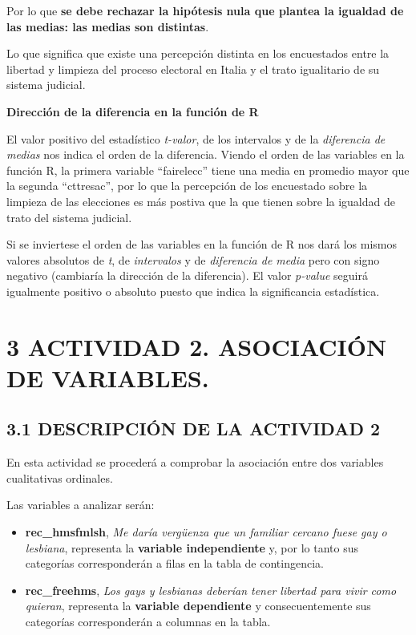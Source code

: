 \documentclass[
  12 pt,
  a4paper,
]{article}
\begin{document}
Por lo que \textbf{se debe rechazar la hipótesis nula que plantea la
igualdad de las medias: las medias son distintas}.

Lo que significa que existe una percepción distinta en los encuestados
entre la libertad y limpieza del proceso electoral en Italia y el trato
igualitario de su sistema judicial.

\textbf{Dirección de la diferencia en la función de R}

El valor positivo del estadístico \emph{t-valor}, de los intervalos y de
la \emph{diferencia de medias} nos indica el orden de la diferencia.
Viendo el orden de las variables en la función R, la primera variable
``fairelecc'' tiene una media en promedio mayor que la segunda
``cttresac'', por lo que la percepción de los encuestado sobre la
limpieza de las elecciones es más postiva que la que tienen sobre la
igualdad de trato del sistema judicial.

Si se inviertese el orden de las variables en la función de R nos dará
los mismos valores absolutos de \emph{t}, de \emph{intervalos} y de
\emph{diferencia de media} pero con signo negativo (cambiaría la
dirección de la diferencia). El valor \emph{p-value} seguirá igualmente
positivo o absoluto puesto que indica la significancia estadística.

\newpage

\section{3 ACTIVIDAD 2. ASOCIACIÓN DE
VARIABLES.}\label{actividad-2.-asociaciuxf3n-de-variables.}

\subsection{3.1 DESCRIPCIÓN DE LA ACTIVIDAD
2}\label{descripciuxf3n-de-la-actividad-2}

En esta actividad se procederá a comprobar la asociación entre dos
variables cualitativas ordinales.

Las variables a analizar serán:

\begin{itemize}
\item
  \textbf{rec\_hmsfmlsh}, \emph{Me daría vergüenza que un familiar
  cercano fuese gay o lesbiana}, representa la \textbf{variable
  independiente} y, por lo tanto sus categorías corresponderán a filas
  en la tabla de contingencia.
\item
  \textbf{rec\_freehms}, \emph{Los gays y lesbianas deberían tener
  libertad para vivir como quieran}, representa la \textbf{variable
  dependiente} y consecuentemente sus categorías corresponderán a
  columnas en la tabla.
\end{itemize}
\end{document}
